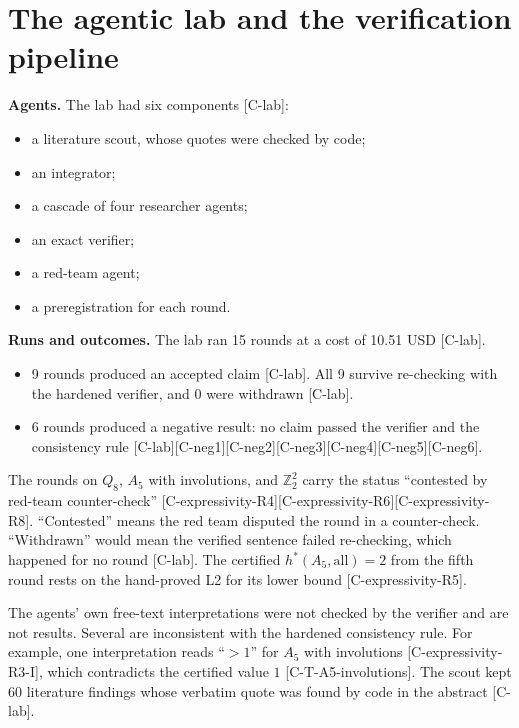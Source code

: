 \documentclass[10pt,twocolumn,a4paper]{article}
\providecommand{\tightlist}{\setlength{\itemsep}{0pt}\setlength{\parskip}{0pt}}
\begin{document}
\section{The agentic lab and the verification pipeline}\label{the-agentic-lab-and-the-verification-pipeline}

\textbf{Agents.} The lab had six components {[}C-lab{]}:

\begin{itemize}
\tightlist
\item
  a literature scout, whose quotes were checked by code;
\item
  an integrator;
\item
  a cascade of four researcher agents;
\item
  an exact verifier;
\item
  a red-team agent;
\item
  a preregistration for each round.
\end{itemize}

\textbf{Runs and outcomes.} The lab ran 15 rounds at a cost of 10.51 USD {[}C-lab{]}.

\begin{itemize}
\tightlist
\item
  9 rounds produced an accepted claim {[}C-lab{]}. All 9 survive re-checking with the hardened verifier, and 0 were withdrawn {[}C-lab{]}.
\item
  6 rounds produced a negative result: no claim passed the verifier and the consistency rule {[}C-lab{]}{[}C-neg1{]}{[}C-neg2{]}{[}C-neg3{]}{[}C-neg4{]}{[}C-neg5{]}{[}C-neg6{]}.
\end{itemize}

The rounds on \(Q_8\), \(A_5\) with involutions, and \(\mathbb{Z}_2^2\) carry the status ``contested by red-team counter-check'' {[}C-expressivity-R4{]}{[}C-expressivity-R6{]}{[}C-expressivity-R8{]}. ``Contested'' means the red team disputed the round in a counter-check. ``Withdrawn'' would mean the verified sentence failed re-checking, which happened for no round {[}C-lab{]}. The certified \(h^*(A_5,\text{all}) = 2\) from the fifth round rests on the hand-proved L2 for its lower bound {[}C-expressivity-R5{]}.

The agents' own free-text interpretations were not checked by the verifier and are not results. Several are inconsistent with the hardened consistency rule. For example, one interpretation reads ``\(> 1\)'' for \(A_5\) with involutions {[}C-expressivity-R3-I{]}, which contradicts the certified value \(1\) {[}C-T-A5-involutions{]}. The scout kept 60 literature findings whose verbatim quote was found by code in the abstract {[}C-lab{]}.
\end{document}
